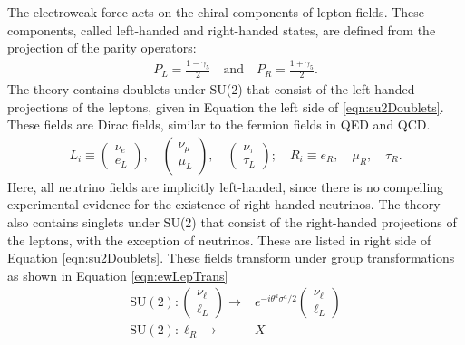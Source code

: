 The electroweak force acts on the chiral components of lepton fields.
These components, called left-handed and right-handed states, are defined from the projection of the parity operators:
\begin{equation}\begin{split}\label{eqn:chiralOps}
P_L=\frac{1-\gamma_5}{2} \quad\text{and}\quad
P_R=\frac{1+\gamma_5}{2}.
\end{split}\end{equation} 
The theory contains doublets under SU(2) that consist of the left-handed projections of the leptons, given in Equation the left side of \ref{eqn:su2Doublets}.
These fields are Dirac fields, similar to the fermion fields in QED and QCD.
\begin{equation}\begin{split}\label{eqn:su2Doublets}
    L_i\equiv\begin{pmatrix}\nu_e\\e_L\end{pmatrix},\quad
    \begin{pmatrix}\nu_\mu\\\mu_L\end{pmatrix},\quad
    \begin{pmatrix}\nu_\tau\\\tau_L\end{pmatrix}; \quad
    R_i\equiv e_R,\quad \mu_R,\quad \tau_R.
\end{split}\end{equation}
Here, all neutrino fields are implicitly left-handed, since there is no compelling experimental evidence for the existence of right-handed neutrinos.
The theory also contains singlets under SU(2) that consist of the right-handed projections of the leptons, with the exception of neutrinos. These are listed in right side of Equation \ref{eqn:su2Doublets}.
These fields transform under group transformations as shown in Equation \ref{eqn:ewLepTrans}
\begin{equation}\begin{split}\label{eqn:ewLepTrans}
    \text{SU}(2): \begin{pmatrix}\nu_\ell\\\ell_L\end{pmatrix}\to& e^{-i\theta^a\sigma^a/2}\begin{pmatrix}\nu_\ell\\\ell_L\end{pmatrix} \\
    \text{SU}(2): \ell_R\to& X \\
\end{split}\end{equation} 

